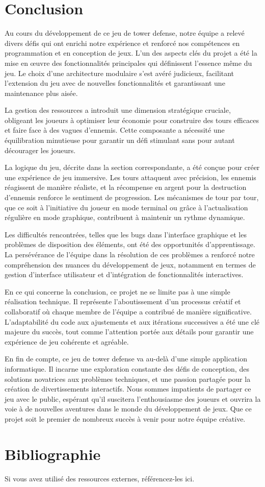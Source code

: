 \documentclass{article}
\begin{document}
\section{Conclusion}
Au cours du développement de ce jeu de tower defense, notre équipe a relevé divers défis qui ont enrichi notre expérience et renforcé nos compétences en programmation et en conception de jeux. L'un des aspects clés du projet a été la mise en œuvre des fonctionnalités principales qui définissent l'essence même du jeu. Le choix d'une architecture modulaire s'est avéré judicieux, facilitant l'extension du jeu avec de nouvelles fonctionnalités et garantissant une maintenance plus aisée.

La gestion des ressources a introduit une dimension stratégique cruciale, obligeant les joueurs à optimiser leur économie pour construire des tours efficaces et faire face à des vagues d'ennemis. Cette composante a nécessité une équilibration minutieuse pour garantir un défi stimulant sans pour autant décourager les joueurs.

La logique du jeu, décrite dans la section correspondante, a été conçue pour créer une expérience de jeu immersive. Les tours attaquent avec précision, les ennemis réagissent de manière réaliste, et la récompense en argent pour la destruction d'ennemis renforce le sentiment de progression. Les mécanismes de tour par tour, que ce soit à l'initiative du joueur en mode terminal ou grâce à l'actualisation régulière en mode graphique, contribuent à maintenir un rythme dynamique.

Les difficultés rencontrées, telles que les bugs dans l'interface graphique et les problèmes de disposition des éléments, ont été des opportunités d'apprentissage. La persévérance de l'équipe dans la résolution de ces problèmes a renforcé notre compréhension des nuances du développement de jeux, notamment en termes de gestion d'interface utilisateur et d'intégration de fonctionnalités interactives.

En ce qui concerne la conclusion, ce projet ne se limite pas à une simple réalisation technique. Il représente l'aboutissement d'un processus créatif et collaboratif où chaque membre de l'équipe a contribué de manière significative. L'adaptabilité du code aux ajustements et aux itérations successives a été une clé majeure du succès, tout comme l'attention portée aux détails pour garantir une expérience de jeu cohérente et agréable.

En fin de compte, ce jeu de tower defense va au-delà d'une simple application informatique. Il incarne une exploration constante des défis de conception, des solutions novatrices aux problèmes techniques, et une passion partagée pour la création de divertissements interactifs. Nous sommes impatients de partager ce jeu avec le public, espérant qu'il suscitera l'enthousiasme des joueurs et ouvrira la voie à de nouvelles aventures dans le monde du développement de jeux. Que ce projet soit le premier de nombreux succès à venir pour notre équipe créative.

\section*{Bibliographie}
Si vous avez utilisé des ressources externes, référencez-les ici.
\end{document}
